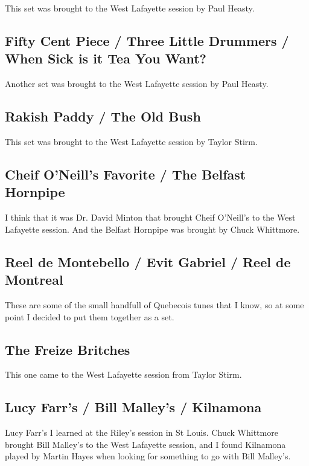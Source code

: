 \documentclass[11pt,letterpaper]{article}
\begin{document}
This set was brought to the West Lafayette session by Paul Heasty.

\subsection{Fifty Cent Piece / Three Little Drummers / When Sick is it Tea You Want?} 

Another set was brought to the West Lafayette session by Paul Heasty.

\subsection{Rakish Paddy / The Old Bush} 

This set was brought to the West Lafayette session by Taylor Stirm.

\subsection{Cheif O'Neill's Favorite / The Belfast Hornpipe} 

I think that it was Dr. David Minton that brought Cheif O'Neill's to the West Lafayette session. And the Belfast Hornpipe was brought by Chuck Whittmore.

\subsection{Reel de Montebello / Evit Gabriel / Reel de Montreal}

These are some of the small handfull of Quebecois tunes that I know, so at some point I decided to put them together as a set. 

\subsection{The Freize Britches}

This one came to the West Lafayette session from Taylor Stirm.

\subsection{Lucy Farr's / Bill Malley's / Kilnamona}

Lucy Farr's I learned at the Riley's session in St Louis. Chuck Whittmore brought Bill Malley's to the West Lafayette session, and I found Kilnamona played by Martin Hayes when looking for something to go with Bill Malley's.
\end{document}
